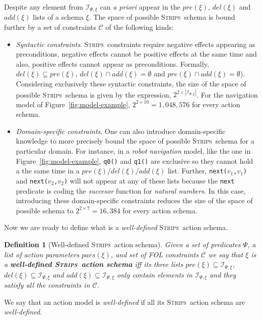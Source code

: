 \documentclass[letterpaper]{article} %
\newcommand{\strips}{\textsc{Strips}}     %
\newtheorem{definition}[theorem]{Definition}
\begin{document}
Despite any element from ${\mathcal I}_{\Psi,\xi}$ can {\em a priori} appear in the $pre(\xi)$, $del(\xi)$ and $add(\xi)$ lists of a schema $\xi$. The space of possible \strips\ schema is bound further by a set of constraints ${\mathcal C}$ of the following kinds: 
\begin{itemize}
\item {\em Syntactic constraints}. \strips\ constraints require negative effects appearing as preconditions, negative effects cannot be positive effects at the same time and also, positive effects cannot appear as preconditions. Formally, $del(\xi)\subseteq pre(\xi)$, $del(\xi)\cap add(\xi)=\emptyset$ and $pre(\xi)\cap add(\xi)=\emptyset$). Considering exclusively these syntactic constraints, the size of the space of possible \strips\ schema is given by the expression, $2^{2\times|{\mathcal I}_{\Psi,\xi}|}$. For the navigation model of Figure~\ref{fig:model-example}, $2^{2\times 10}=1,048,576$ for every action schema.
\item {\em Domain-specific constraints}. One can also introduce domain-specific knowledge to more precisely bound the space of possible \strips\ schema for a particular domain. For instance, in a {\em robot navigation} model, like the one in Figure~\ref{fig:model-example}, {\small\tt q0()} and {\small\tt q1()} are exclusive so they cannot hold a the same time in a $pre(\xi)$/$del(\xi)$/$add(\xi)$ list. Further, {\small\tt next($v_1$,$v_1$)} and {\small\tt next($v_2$,$v_2$)} will not appear at any of these lists because the {\tt\small next} predicate is coding the {\em succesor} function for {\em natural numbers}. In this case, introducing these domain-specific constraints reduces the size of the space of possible schema to $2^{2\times 7}=16,384$ for every action schema.
\end{itemize}

Now we are ready to define what is a {\em well-defined} \strips\ action schema.
\begin{definition}[Well-defined \strips\ action schema]
Given a set of {\em predicates} $\Psi$, a list of action {\em parameters} $pars(\xi)$, and set of FOL constraints ${\mathcal C}$ we say that $\xi$ is a {\bf well-defined \strips\ action schema} iff its three lists $pre(\xi)\subseteq {\mathcal I}_{\Psi,\xi}$, $del(\xi)\subseteq{\mathcal I}_{\Psi,\xi}$ and $add(\xi)\subseteq{\mathcal I}_{\Psi,\xi}$ only contain elements in ${\mathcal I}_{\Psi,\xi}$ and they satisfy all the constraints in ${\mathcal C}$. 
\end{definition}
We say that an action model is {\em well-defined} if all its \strips\ action schema are {\em well-defined}.
\end{document}
